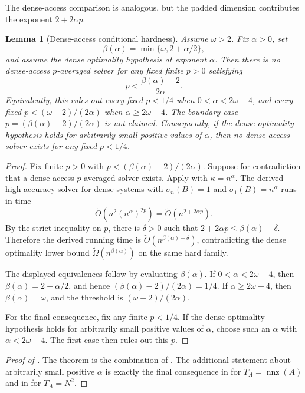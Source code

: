 \documentclass[11pt]{article}
\newtheorem{lemma}{Lemma}[section]
\begin{document}
The dense-access comparison is analogous, but the padded dimension contributes
the exponent $2+2\alpha p$.

\begin{lemma}[Dense-access conditional hardness]
\label{lem:conditional-hardness-dense-fixed-p}
Assume $\omega>2$.  Fix $\alpha>0$, set
\[
  \beta(\alpha)=\min\{\omega,2+\alpha/2\},
\]
and assume the dense optimality hypothesis at exponent $\alpha$.  Then there
is no dense-access $p$-averaged solver for any fixed finite $p>0$ satisfying
\[
  p<\frac{\beta(\alpha)-2}{2\alpha}.
\]
Equivalently, this rules out every fixed $p<1/4$ when
$0<\alpha<2\omega-4$, and every fixed $p<(\omega-2)/(2\alpha)$ when
$\alpha\geq2\omega-4$.  The boundary case
$p=(\beta(\alpha)-2)/(2\alpha)$ is not claimed.  Consequently, if the dense
optimality hypothesis holds for arbitrarily small positive values of $\alpha$,
then no dense-access solver exists for any fixed $p<1/4$.
\end{lemma}

\begin{proof}
Fix finite $p>0$ with $p<(\beta(\alpha)-2)/(2\alpha)$.  Suppose for
contradiction that a dense-access $p$-averaged solver exists.  Apply
 with $\kappa=n^{\alpha}$.  The derived
high-accuracy solver for dense systems with $\sigma_n(B)=1$ and
$\sigma_1(B)=n^{\alpha}$ runs in time
\[
  \widetilde{O}(n^2(n^{\alpha})^{2p})
  =
  \widetilde{O}(n^{2+2\alpha p}).
\]
By the strict inequality on $p$, there is $\delta>0$ such that
$2+2\alpha p\leq\beta(\alpha)-\delta$.  Therefore the derived running time is
$\widetilde{O}(n^{\beta(\alpha)-\delta})$, contradicting the dense optimality
lower bound $\widetilde{\Omega}(n^{\beta(\alpha)})$ on the same hard family.

The displayed equivalences follow by evaluating $\beta(\alpha)$.  If
$0<\alpha<2\omega-4$, then $\beta(\alpha)=2+\alpha/2$, and hence
$(\beta(\alpha)-2)/(2\alpha)=1/4$.  If $\alpha\geq2\omega-4$, then
$\beta(\alpha)=\omega$, and the threshold is $(\omega-2)/(2\alpha)$.

For the final consequence, fix any finite $p<1/4$.  If the dense optimality
hypothesis holds for arbitrarily small positive values of $\alpha$, choose
such an $\alpha$ with $\alpha<2\omega-4$.  The first case then rules out this
$p$.
\end{proof}

\begin{proof}[Proof of ]
The theorem is the combination of
.
The additional statement about arbitrarily small positive $\alpha$ is exactly
the final consequence in  for
$T_A=\operatorname{nnz}(A)$ and in
 for $T_A=N^2$.
\end{proof}



\end{document}
